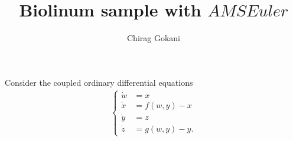 \documentclass[12pt]{article}\usepackage{amsmath}
\title{Biolinum sample with \(AMS Euler\)}
\author{Chirag Gokani}
\begin{document}
\maketitle
Consider the coupled ordinary differential equations
\begin{align}
\begin{cases}
\dot{w} &= x\\
\dot{x} &= f(w, y) - x\\
\dot{y} &= z\\
\dot{z} &= g(w, y) -  y.
\end{cases}
\end{align}   
\lipsum[1-2]
\end{document}

